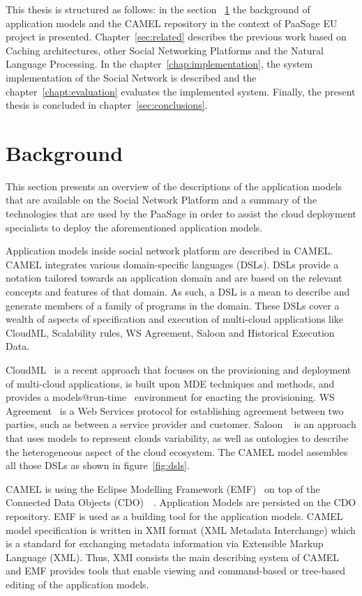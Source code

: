 This thesis is structured as follows: in the section ~\ref{sec:background} the background of application models and the CAMEL repository in the context of PaaSage EU project is presented. Chapter~\ref{sec:related} describes the previous work based on Caching architectures, other Social Networking Platforms and the Natural Language Processing. In the chapter~\ref{chap:implementation}, the system implementation of the Social Network is described and the chapter~\ref{chapt:evaluation} evaluates the implemented system. Finally, the present thesis is concluded in chapter~\ref{sec:conclusions}.

\section{Background}
\label{sec:background}
This section presents an overview of the descriptions of the application models that are available on the Social Network Platform and a summary of the technologies that are used by the PaaSage in order to assist the cloud deployment specialists to deploy the aforementioned application models.

Application models inside social network platform are described in CAMEL. CAMEL integrates various domain-specific languages (DSLs).
DSLs provide a notation tailored towards an application domain and are based on the relevant concepts and features of that domain. As such, a DSL is a mean to describe and generate members of a family of programs in the domain. 
These DSLs cover a wealth of aspects of specification and execution of multi-cloud applications like CloudML, Scalability rules, WS Agreement, Saloon and Historical Execution Data. 

CloudML~\cite{FerryRossiniCMS13} is a recent approach that focuses on the provisioning and deployment of multi-cloud applications, is built upon MDE techniques and methods, and provides a models@run-time~\cite{models-runtime} environment for enacting the provisioning.  WS Agreement~\cite{andrieux2007web} is a Web Services protocol for establishing agreement between two parties, such as between a service provider and customer. Saloon ~\cite{quinton2013towards} is an approach that uses models to represent clouds variability, as well as ontologies to describe the heterogeneous aspect of the cloud ecosystem. The CAMEL model assembles all those DSLs as shown in figure~\ref{fig:dsls}.

CAMEL is using the Eclipse Modelling Framework (EMF)~\cite{steinberg2008emf} on top of the Connected Data Objects (CDO)~\cite{cdomodel}~\cite{paasage-d4.1.1}. Application Models are persisted on the CDO repository. EMF is used as a building tool for the application models. CAMEL model specification is written in XMI format (XML Metadata Interchange) which is a standard for exchanging metadata information via Extensible Markup Language (XML). Thus, XMI consists the main describing system of CAMEL and EMF provides tools that enable viewing and command-based or tree-based editing of the application models. 

